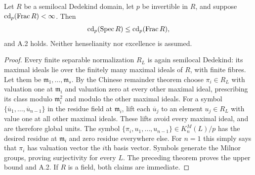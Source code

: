 \begin{corollary}
\label{A:semilocal-Dedekind}
Let $R$ be a semilocal Dedekind domain, let $p$ be invertible in
$R$, and suppose $\operatorname{cd}_p(\operatorname{Frac} R)<\infty$. Then
\[
 \operatorname{cd}_p(\operatorname{Spec} R)\leq\operatorname{cd}_p(\operatorname{Frac} R),
\]
and A.2 holds. Neither henselianity nor excellence is assumed.
\end{corollary}
\begin{proof}
Every finite separable normalization $R_L$ is again semilocal
Dedekind: its maximal ideals lie over the finitely many maximal
ideals of $R$, with finite fibres. Let them be
$\mathfrak m_1,\ldots,\mathfrak m_s$. By the Chinese remainder
theorem choose $\pi_i\in R_L$ with valuation one at
$\mathfrak m_i$ and valuation zero at every other maximal ideal,
prescribing its class modulo $\mathfrak m_i^2$ and modulo the
other maximal ideals. For a symbol
$\{\overline u_1,\ldots,\overline u_{n-1}\}$ in the residue field
at $\mathfrak m_i$, lift each $\overline u_j$ to an element
$u_j\in R_L$ with value one at all other maximal ideals. These
lifts avoid every maximal ideal, and are therefore global units.
The symbol $\{\pi_i,u_1,\ldots,u_{n-1}\}\in K_n^M(L)/p$ has the
desired residue at $\mathfrak m_i$ and zero residue everywhere
else. For $n=1$ this simply says that $\pi_i$ has valuation vector
the $i$th basis vector. Symbols generate the Milnor groups,
proving surjectivity for every $L$. The preceding theorem proves
the upper bound and A.2. If $R$ is a field, both claims are immediate.
\end{proof}

